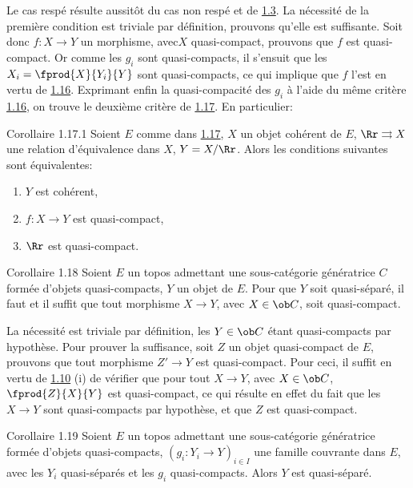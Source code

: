 Le cas respé résulte aussitôt du cas non respé et de \hyperref[VI.prop1.3]{1.3}. La nécessité
de la première condition est triviale par définition, prouvons qu'elle
est suffisante. Soit donc $f : X \to Y$ un morphisme, avec\pageoriginale $X$
quasi-compact, prouvons que $f$ est quasi-compact. Or comme les $g_i$
sont quasi-compacts, il s'ensuit que les $X_i = \fprod{X}{Y_i}{Y}$
sont quasi-compacts, ce qui implique que $f$ l'est en vertu de
\hyperref[VI.cor1.16]{1.16}. Exprimant enfin la quasi-compacité des $g_i$ à l'aide du même
critère \hyperref[VI.cor1.16]{1.16}, on trouve le deuxième critère de \hyperref[VI.cor1.17]{1.17}. En particulier:

\begin{enonce*}{Corollaire 1.17.1}
Soient $E$ comme dans \hyperref[VI.cor1.17]{1.17}, $X$ un objet cohérent de
$E$, $\Rr \rightrightarrows X$ une relation d'équivalence dans $X$,
$Y = X / \Rr$. Alors les conditions suivantes sont équivalentes:
\begin{enumerate}
\renewcommand{\theenumi}{\roman{enumi}}
\renewcommand{\labelenumi}{(\theenumi)}
\item $Y$ est cohérent,
\item $f : X \to Y$ est quasi-compact,
\item $\Rr$ est quasi-compact.
\end{enumerate}
\end{enonce*}

\begin{enonce*}{Corollaire 1.18}
Soient $E$ un topos admettant une sous-catégorie génératrice $C$
formée d'objets quasi-compacts, $Y$ un objet de $E$. Pour que $Y$ soit
quasi-séparé, il faut et il suffit que tout morphisme $X \to Y$, avec
$X \in \ob C$, soit quasi-compact.
\end{enonce*}

La nécessité est triviale par définition, les $Y \in \ob C$ étant
quasi-compacts par hypothèse. Pour prouver la suffisance, soit $Z$
un objet quasi-compact de $E$, prouvons que tout morphisme $Z'\to Y$
est quasi-compact. Pour ceci, il suffit en vertu de
\hyperref[VI.prop1.10]{1.10} (i) de vérifier que pour tout $X \to Y$, avec $X
\in \ob C$, $\fprod{Z}{X}{Y}$ est quasi-compact, ce qui résulte en
effet du fait que les $X \to Y$ sont quasi-compacts par hypothèse,
et que $Z$ est quasi-compact.

\begin{enonce*}{Corollaire 1.19}
Soient \pageoriginale $E$ un topos admettant une sous-catégorie
génératrice formée d'objets quasi-compacts, $(g_i : Y_i \to Y)_{i \in
  I}$ une famille couvrante dans $E$, avec les $Y_i$ quasi-séparés et
les $g_i$ quasi-compacts. Alors $Y$ est quasi-séparé.
\end{enonce*}

